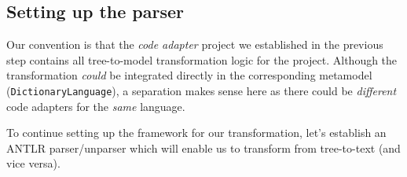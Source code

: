 \newpage
\hypertarget{subSec:setupParser}{}
\subsection{Setting up the parser}
\genHeader

Our convention is that the \emph{code adapter} project we established in the previous step contains all tree-to-model transformation logic for the project.
Although the transformation \emph{could} be integrated directly in the corresponding metamodel (\texttt{Dic\-tion\-ary\-Language}), a separation makes sense here as
there could be \emph{different} code adapters for the \emph{same} language. 

To continue setting up the framework for our transformation, let's establish an ANTLR parser/unparser which will enable us to transform from tree-to-text (and
vice versa).

